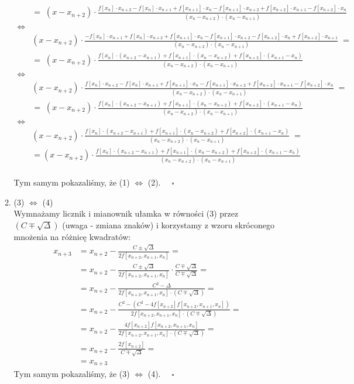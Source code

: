 \documentclass[12pt]{article}
\newcommand{\0}{x_{n}}
\newcommand{\1}{x_{n+1}}
\newcommand{\2}{x_{n+2}}
\newcommand{\3}{x_{n+3}}
\begin{document}
\begin{enumerate}[1.]
\begin{enumerate}[$\bullet$]
\begin{align*}
&= \; \scriptstyle (x - \2) \cdot \frac{f[\0] \cdot \2 - f[\0] \cdot \1 + f[\1] \cdot \0 - f[\1] \cdot \2 + f[\2] \cdot \1  - f[\2] \cdot \0}{(\0 - \2) \cdot (\0 - \1)} \\
\Leftrightarrow & \\
& \scriptstyle (x - \2) \cdot \frac{ - f[\0] \cdot \1 + f[\0] \cdot \2 + f[\1] \cdot \0 - f[\1] \cdot \2 - f[\2] \cdot \0 + f[\2] \cdot \1}{(\0 - \2) \cdot (\0 - \1)}\; = \\[1ex]
&= \; \scriptstyle (x - \2) \cdot \frac{f[\0] \cdot (\2 - \1) + f[\1] \cdot (\0 - \2) + f[\2] \cdot (\1 - \0)}{(\0 - \2) \cdot (\0 - \1)} \\
\Leftrightarrow & \\
& \scriptstyle (x - \2) \cdot \frac{f[\0] \cdot \2 - f[\0] \cdot \1 + f[\1] \cdot \0 - f[\1] \cdot \2 + f[\2] \cdot \1 - f[\2] \cdot \0}{(\0 - \2) \cdot (\0 - \1)}\; = \\[1ex]
&= \; \scriptstyle (x - \2) \cdot \frac{f[\0] \cdot (\2 - \1) + f[\1] \cdot (\0 - \2) + f[\2] \cdot (\1 - \0)}{(\0 - \2) \cdot (\0 - \1)} \\
\Leftrightarrow & \\
& (x - \2) \cdot \frac{f[\0] \cdot (\2 - \1) + f[\1] \cdot (\0 - \2) + f[\2] \cdot (\1 - \0)}{(\0 - \2) \cdot (\0 - \1)}\; = \\[1ex]
&= (x - \2) \cdot \frac{f[\0] \cdot (\2 - \1) + f[\1] \cdot (\0 - \2) + f[\2] \cdot (\1 - \0)}{(\0 - \2) \cdot (\0 - \1)}
\end{align*}\\
Tym samym pokazaliśmy, że (1) $\Leftrightarrow$ (2). $\quad \square$
\bigskip
\bigskip
\item (3) $\Leftrightarrow$ (4) \medskip \\
Wymnażamy licznik i mianownik ułamka w równości (3) przez $(C \mp \sqrt{\Delta})$ (uwaga - zmiana znaków) i korzystamy z wzoru skróconego mnożenia na różnicę kwadratów:
\begin{align*}
\3 &= \2 - \frac{C \pm \sqrt{\Delta}}{2f[\2, \1, \0]} =\\[1ex]
&= \2 - \frac{C \pm \sqrt{\Delta}}{2f[\2, \1, \0]} \cdot \frac{C \mp \sqrt{\Delta}}{C \mp \sqrt{\Delta}} =\\[1ex]
&= \2 - \frac{C^2 - \Delta}{2f[\2, \1, \0] \cdot (C \mp \sqrt{\Delta})} =\\[1ex]
&= \2 - \frac{C^2 - \left(C^2 - 4f[\2]f[\2, \1, \0]\right)}{2f[\2, \1, \0] \cdot (C \mp \sqrt{\Delta})} =\\[1ex]
&= \2 - \frac{4f[\2]f[\2, \1, \0]}{2f[\2, \1, \0] \cdot (C \mp \sqrt{\Delta})} =\\[1ex]
&= \2 - \frac{2f[\2]}{C \mp \sqrt{\Delta}} =\\[1ex]
&= \3
\end{align*}
Tym samym pokazaliśmy, że (3) $\Leftrightarrow$ (4). $\quad \square$ \\\\\\
\end{enumerate}
\end{enumerate}
\end{document}

